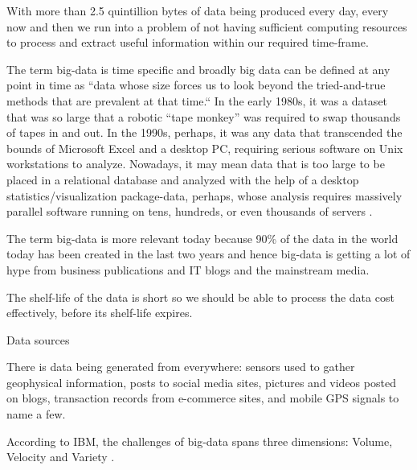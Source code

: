 \documentclass[12pt,a4paper]{report}
\begin{document}
With more than 2.5 quintillion bytes of data \cite{website:ibm-bigdata} being produced
every day, every now and then we run into a problem of not having 
sufficient computing resources to process and extract useful information
within our required time-frame.

The term big-data is time specific and broadly
big data can be defined at any point in time as ``data whose size forces us
 to look beyond the tried-and-true methods
that are prevalent at that time.`` In the early 1980s, it was a dataset that was
 so large that a robotic ``tape monkey'' was required to swap thousands of tapes in and out.
In the 1990s, perhaps, it was any data that transcended the bounds of Microsoft
Excel and a desktop PC, requiring serious software on Unix workstations to
analyze. Nowadays, it may mean data 
that is too large to be placed in a relational database and analyzed with the
help of a desktop statistics/visualization package-data, perhaps, whose
analysis requires massively parallel software running on tens, hundreds, or
even thousands of servers \cite{jacobs2009pathologies}.

The term big-data is more relevant today because 90\% \cite{website:ibm-bigdata}
of the data in the world today has been created in the last two years and 
hence big-data is getting a lot of hype from business publications and IT blogs
and the mainstream media. 

The shelf-life of the data is short so we should be able to process the data cost effectively,
before its shelf-life expires.


Data sources

There is data being generated from everywhere: sensors used to gather geophysical information, 
posts to social media sites, pictures and videos posted on blogs, transaction
records from e-commerce sites, and mobile GPS signals to name a few.

According to IBM, the challenges of big-data spans three dimensions: Volume,
Velocity and Variety \cite{website:ibm-bigdata}.
\end{document}
